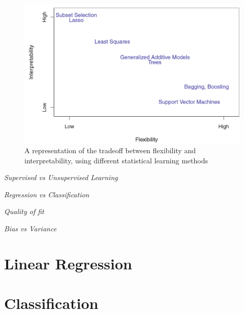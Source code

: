 \documentclass[12pt,a4paper]{article}
\begin{document}
\begin{figure}[hbtp]
\centering
\includegraphics[scale=0.5]{F1.png}
\caption{A representation of the tradeoﬀ between ﬂexibility and interpretability, using diﬀerent statistical learning methods}
\end{figure}

\textit{Supervised vs Unsupervised Learning}\\
\newline

\textit{Regression vs Classification}\\
\newline

\textit{Quality of fit}\\
\newline

\begin{center}
\end{center}

\textit{Bias vs Variance}\\
\newline

\begin{center}
\end{center}

\section{Linear Regression}
\section{Classification}
\end{document}
